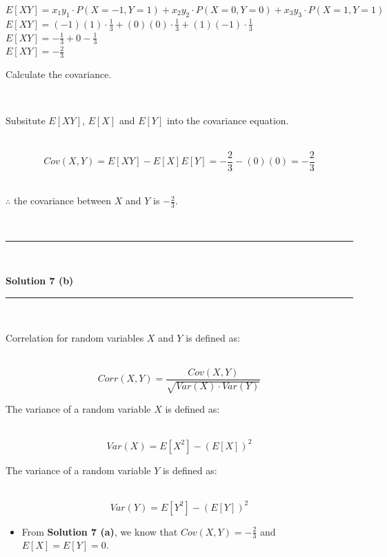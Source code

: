 \documentclass{article}
\begin{document}
$E[XY] = x_1 y_1\cdot P(X=-1,Y=1) + x_2 y_2\cdot P(X=0,Y=0)+ x_3 y_3\cdot P(X=1,Y=1)$\\

$E[XY] = (-1)(1) \cdot \frac{1}{3} + (0)(0) \cdot \frac{1}{3}+ (1)(-1)\cdot \frac{1}{3}$\\

$E[XY] = -\frac{1}{3} + 0 - \frac{1}{3}$\\

$E[XY] = -\frac{2}{3}$\\

\parbox{\textwidth}{Calculate the covariance.}\\

\parbox{\textwidth}{Subsitute $E[XY]$, $E[X]$ and $E[Y]$ into the covariance equation.}\\

$$Cov(X, Y) = E[XY] - E[X]E[Y] = -\frac{2}{3} - (0)(0) = -\frac{2}{3}$$\\

\parbox{\textwidth}{$\therefore$ the covariance between $X$ and $Y$ is $-\frac{2}{3}$.}\\

\noindent\rule{\textwidth}{0.4pt}\\

\newpage

\textbf{Solution 7 (b)}

\noindent\rule{\textwidth}{0.4pt}\\

\parbox{\textwidth}{Correlation for random variables $X$ and $Y$ is defined as:}\\

$$Corr(X, Y) = \frac{Cov(X, Y)}{\sqrt{Var(X) \cdot Var(Y)}}$$

\parbox{\textwidth}{The variance of a random variable $X$ is defined as:}\\

$$Var(X) = E[X^2] - (E[X])^2$$

\parbox{\textwidth}{The variance of a random variable $Y$ is defined as:}\\

$$Var(Y) = E[Y^2] - (E[Y])^2$$

\begin{itemize}
  \item \parbox{\textwidth}{From \textbf{Solution 7 (a)}, we know that $Cov(X,Y) = -\frac{2}{3}$ and $E[X] = E[Y] = 0$.}\\
\end{itemize}
\end{document}
